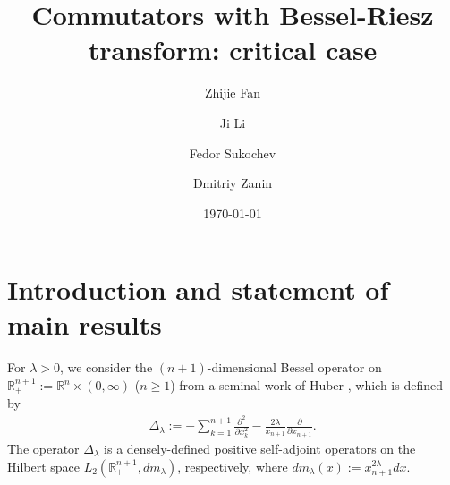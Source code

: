 \documentclass[12pt]{amsart}
\begin{document}
\baselineskip 16.6pt
\hfuzz=6pt

\newtheorem{cl}{Claim}
\newtheorem{theorem}{Theorem}[section]
\newtheorem{proposition}[theorem]{Proposition}
\newtheorem{coro}[theorem]{Corollary}
\newtheorem{lemma}[theorem]{Lemma}
\newtheorem{definition}[theorem]{Definition}
\newtheorem{assum}{Assumption}[section]
\newtheorem{example}[theorem]{Example}
\newtheorem{remark}[theorem]{Remark}
\newtheorem{fact}[theorem]{Fact}
\newtheorem{nota}[theorem]{Notation}
\renewcommand{\theequation}
{\thesection.\arabic{equation}}


\title[]{Commutators with Bessel-Riesz transform: critical case}

\author{Zhijie Fan}
\address{Zhijie Fan, School of Mathematics and Information Science,
Guangzhou University, Guangzhou 510006, China}

\author{Ji Li}
\address{Ji Li, School of Mathematical and Physical Sciences, Macquarie University, NSW 2109, Australia}

\author{Fedor Sukochev}
\address{Fedor Sukochev, University of New South Wales, Kensington, NSW 2052, Australia}

\author{Dmitriy Zanin}
\address{Dmitriy Zanin, University of New South Wales, Kensington, NSW 2052, Australia}







\date{\today}





\begin{abstract}

\end{abstract}

\maketitle


\tableofcontents



\section{Introduction and statement of main results}
For $\lambda> 0$, we consider the $(n+1)$-dimensional Bessel operator on $\mathbb{R}^{n+1}_+:=\mathbb{R}^n\times (0,\infty)$ ($n\geq 1$) from a seminal work of Huber \cite{MR64284}, which is defined by
\begin{align}\label{Dlambda}
\Delta_\lambda:= -\sum_{k=1}^{n+1}\frac{\partial^2}{\partial x_k^2}-\frac{2\lambda}{x_{n+1}}\frac{\partial}{\partial x_{n+1}}.
\end{align}
The operator $\Delta_\lambda$ is a densely-defined positive self-adjoint operators on the Hilbert space $L_2(\mathbb{R}_+^{n+1}, dm_\lambda)$, respectively,  where $dm_\lambda(x):=x_{n+1}^{2\lambda}dx.$
\end{document}
